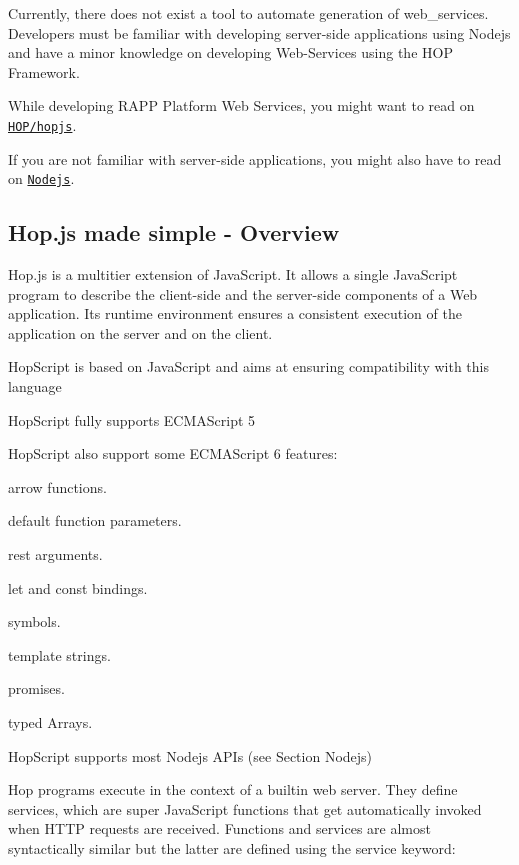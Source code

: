 Currently, there does not exist a tool to automate generation of web\-\_\-services. Developers must be familiar with developing server-\/side applications using Nodejs and have a minor knowledge on developing Web-\/\-Services using the H\-O\-P Framework.

While developing R\-A\-P\-P Platform Web Services, you might want to read on \href{https://github.com/manuel-serrano/hop}{\tt H\-O\-P/hopjs}.

If you are not familiar with server-\/side applications, you might also have to read on \href{https://nodejs.org/en/}{\tt Nodejs}.

\subsection*{Hop.\-js made simple -\/ Overview}

Hop.\-js is a multitier extension of Java\-Script. It allows a single Java\-Script program to describe the client-\/side and the server-\/side components of a Web application. Its runtime environment ensures a consistent execution of the application on the server and on the client.

Hop\-Script is based on Java\-Script and aims at ensuring compatibility with this language


\begin{DoxyItemize}
\item Hop\-Script fully supports E\-C\-M\-A\-Script 5
\item Hop\-Script also support some E\-C\-M\-A\-Script 6 features\-:
\begin{DoxyItemize}
\item arrow functions.
\item default function parameters.
\item rest arguments.
\item let and const bindings.
\item symbols.
\item template strings.
\item promises.
\item typed Arrays.
\end{DoxyItemize}
\item Hop\-Script supports most Nodejs A\-P\-Is (see Section Nodejs)
\end{DoxyItemize}

Hop programs execute in the context of a builtin web server. They define services, which are super Java\-Script functions that get automatically invoked when H\-T\-T\-P requests are received. Functions and services are almost syntactically similar but the latter are defined using the service keyword\-:

